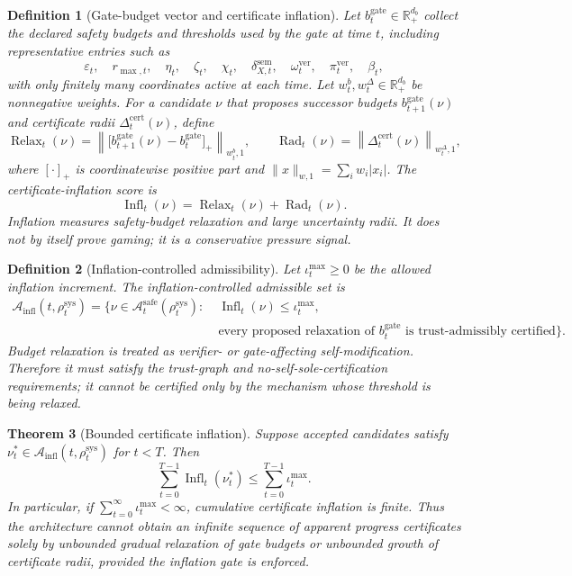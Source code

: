 \documentclass[11pt,a4paper]{article}
\newtheorem{theorem}{Theorem}[section]
\newtheorem{definition}[theorem]{Definition}
\newcommand{\Acal}{\mathcal A}
\newcommand{\eps}{\varepsilon}
\newcommand{\sem}{\mathrm{sem}}
\newcommand{\sys}{\mathrm{sys}}
\newcommand{\safe}{\mathrm{safe}}
\newcommand{\ver}{\mathrm{ver}}
\newcommand{\cert}{\mathrm{cert}}
\newcommand{\infl}{\mathrm{infl}}
\newcommand{\gate}{\mathrm{gate}}
\begin{document}
\begin{definition}[Gate-budget vector and certificate inflation]
\label{def:gate-budget-vector-inflation}
Let \(b_t^{\gate}\in\mathbb R_+^{d_b}\) collect the declared safety budgets and thresholds used by the gate at time \(t\), including representative entries such as
\[
\eps_t,\quad r_{\max,t},\quad \eta_t,\quad \zeta_t,\quad \chi_t,\quad \delta_{X,t}^{\sem},\quad \omega_t^{\ver},\quad \pi_t^{\ver},\quad \beta_t,
\]
with only finitely many coordinates active at each time. Let \(w_t^b,w_t^\Delta\in\mathbb R_+^{d_b}\) be nonnegative weights. For a candidate \(\nu\) that proposes successor budgets \(b_{t+1}^{\gate}(\nu)\) and certificate radii \(\Delta_t^{\cert}(\nu)\), define
\[
\operatorname{Relax}_t(\nu)
=
\left\|\bigl[b_{t+1}^{\gate}(\nu)-b_t^{\gate}\bigr]_+\right\|_{w_t^b,1},
\qquad
\operatorname{Rad}_t(\nu)
=
\left\|\Delta_t^{\cert}(\nu)\right\|_{w_t^\Delta,1},
\]
where \([\cdot]_+\) is coordinatewise positive part and \(\|x\|_{w,1}=\sum_i w_i|x_i|\). The certificate-inflation score is
\[
\operatorname{Infl}_t(\nu)=\operatorname{Relax}_t(\nu)+\operatorname{Rad}_t(\nu).
\]
Inflation measures safety-budget relaxation and large uncertainty radii. It does not by itself prove gaming; it is a conservative pressure signal.
\end{definition}

\begin{definition}[Inflation-controlled admissibility]
\label{def:inflation-controlled-admissibility}
Let \(\iota_t^{\max}\ge0\) be the allowed inflation increment. The inflation-controlled admissible set is
\[
\begin{aligned}
\Acal_{\infl}(t,\rho_t^{\sys})
=
\bigl\{\nu\in\Acal_t^{\safe}(\rho_t^{\sys}):\;&
\operatorname{Infl}_t(\nu)\le\iota_t^{\max},\\
&\text{every proposed relaxation of }b_t^{\gate}
\text{ is trust-admissibly certified}
\bigr\}.
\end{aligned}
\]
Budget relaxation is treated as verifier- or gate-affecting self-modification. Therefore it must satisfy the trust-graph and no-self-sole-certification requirements; it cannot be certified only by the mechanism whose threshold is being relaxed.
\end{definition}

\begin{theorem}[Bounded certificate inflation]
\label{thm:bounded-certificate-inflation}
Suppose accepted candidates satisfy \(\nu_t^*\in\Acal_{\infl}(t,\rho_t^{\sys})\) for \(t<T\). Then
\[
\sum_{t=0}^{T-1}\operatorname{Infl}_t(\nu_t^*)
\le
\sum_{t=0}^{T-1}\iota_t^{\max}.
\]
In particular, if \(\sum_{t=0}^{\infty}\iota_t^{\max}<\infty\), cumulative certificate inflation is finite. Thus the architecture cannot obtain an infinite sequence of apparent progress certificates solely by unbounded gradual relaxation of gate budgets or unbounded growth of certificate radii, provided the inflation gate is enforced.
\end{theorem}
\end{document}
